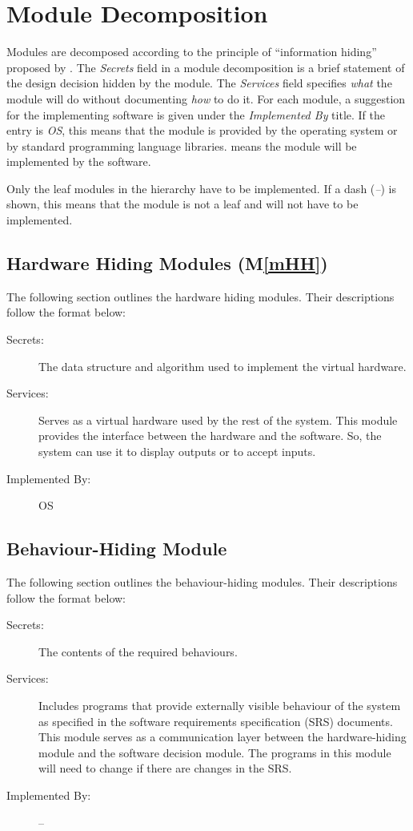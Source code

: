 \documentclass[12pt, titlepage]{article}
\newcommand{\mref}[1]{M\ref{#1}}
\begin{document}
\section{Module Decomposition} \label{SecMD}

Modules are decomposed according to the principle of ``information hiding''
proposed by \citet{ParnasEtAl1984}. The \emph{Secrets} field in a module
decomposition is a brief statement of the design decision hidden by the
module. The \emph{Services} field specifies \emph{what} the module will do
without documenting \emph{how} to do it. For each module, a suggestion for the
implementing software is given under the \emph{Implemented By} title. If the
entry is \emph{OS}, this means that the module is provided by the operating
system or by standard programming language libraries.  \emph{\progname{}} means the
module will be implemented by the \progname{} software.

Only the leaf modules in the hierarchy have to be implemented. If a dash
(\emph{--}) is shown, this means that the module is not a leaf and will not have
to be implemented.

\subsection{Hardware Hiding Modules (\mref{mHH})}
The following section outlines the hardware hiding modules. Their 
descriptions follow the format below: 

\begin{description}
\item[Secrets:]The data structure and algorithm used to implement the virtual
  hardware.
\item[Services:]Serves as a virtual hardware used by the rest of the
  system. This module provides the interface between the hardware and the
  software. So, the system can use it to display outputs or to accept inputs.
\item[Implemented By:] OS
\end{description}

\subsection{Behaviour-Hiding Module}
The following section outlines the behaviour-hiding modules. Their 
descriptions follow the format below: 

\begin{description}
\item[Secrets:]The contents of the required behaviours.
\item[Services:]Includes programs that provide externally visible behaviour of
  the system as specified in the software requirements specification (SRS)
  documents. This module serves as a communication layer between the
  hardware-hiding module and the software decision module. The programs in this
  module will need to change if there are changes in the SRS.
\item[Implemented By:] --
\end{description}
\end{document}

